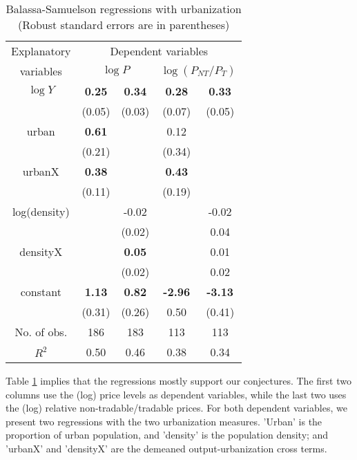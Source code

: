 \documentclass[12pt]{article}
\begin{document}
\begin{table}[h]
\caption{Balassa-Samuelson regressions with urbanization (Robust
standard errors are in parentheses)} \center \label{tab:BS}
\begin{tabular}{c|cc|cc}
  \hline\hline
  Explanatory & \multicolumn{4}{c}{Dependent variables} \\
  variables &\multicolumn{2}{c}{$\log P$} & \multicolumn{2}{c}{$\log(P_{NT}/P_T)$} \\ \hline
  $\log Y$ & \textbf{0.25} & \textbf{0.34} & \textbf{0.28}   & \textbf{0.33} \\
           & (0.05)        & (0.03)        & (0.07)          & (0.05)        \\
  urban    & \textbf{0.61} &               & 0.12            &               \\
           & (0.21)        &               & (0.34)          &               \\
  urbanX   & \textbf{0.38} &               & \textbf{0.43}   &              \\
           & (0.11)        &               & (0.19)          &              \\
  log(density) &           & -0.02         &                 & -0.02        \\
             &             & (0.02)        &                 &  0.04        \\
  densityX &               & \textbf{0.05} &                  & 0.01         \\
           &               & (0.02)        &                 & 0.02         \\
  constant & \textbf{1.13} & \textbf{0.82} & \textbf{-2.96}  & \textbf{-3.13}\\
           & (0.31)        & (0.26)        & 0.50            & (0.41)        \\ \hline
  No. of obs. & 186        & 183           & 113             & 113          \\
  $R^2$    & 0.50          & 0.46          & 0.38            & 0.34  \\
  \hline\hline
\end{tabular}
\end{table}

Table \ref{tab:BS} implies that the regressions mostly support our
conjectures. The first two columns use the (log) price levels as
dependent variables, while the last two uses the (log) relative
non-tradable/tradable prices. For both dependent variables, we
present two regressions with the two urbanization measures. 'Urban'
is the proportion of urban population, and 'density' is the
population density; and 'urbanX' and 'densityX' are the demeaned
output-urbanization cross terms.
\end{document}
